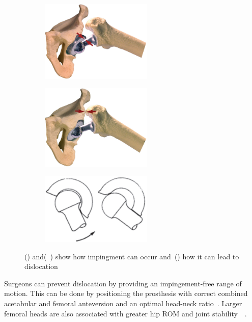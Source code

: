 \documentclass[whitelogo]{tudelft-report}
\begin{document}
{	
\begin{figure}[ht]
	\centering
	\begin{subfigure}{0.33\linewidth}
		\centering\includegraphics[width=150pt]{hipinpingement1.jpg}
		\caption{\label{fig:fig1}}
		\end{subfigure}%
		\begin{subfigure}{0.33\linewidth}
		\centering\includegraphics[width=150pt]{hipinpingement2.jpg}
		\caption{\label{fig:fig2}}
	\end{subfigure}
	\begin{subfigure}{0.33\linewidth}
		\centering\includegraphics[width=150pt]{Dislocation.jpg}
		\caption{\label{fig:fig3}}
	\end{subfigure}
	\caption{() and(~) show how impingment can occur and~() how it can lead to dislocation}
\end{figure}
Surgeons can prevent dislocation by providing an impingement-free range of motion. This can be done by positioning the prosthesis with correct combined acetabular and femoral anteversion and an optimal head-neck ratio~\cite{biedermann2005reducing}. Larger femoral heads are also associated with greater hip ROM and joint stability~\cite{burroughs2005range}~\cite{pivec2012hip}. 

	
}
\end{document}
